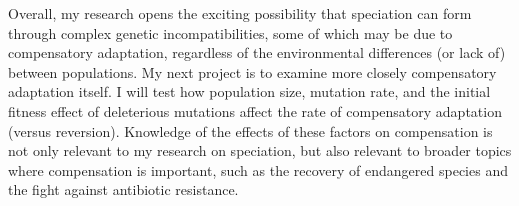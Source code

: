 \documentclass[12pt]{article}
\begin{document}
Overall, my research opens the exciting possibility
that speciation can form through complex genetic incompatibilities,
some of which may be due to compensatory adaptation,
regardless of the environmental differences (or lack of) between populations.
%
My next project is to examine more closely compensatory adaptation itself.
%
I will test how population size, mutation rate,
and the initial fitness effect of deleterious mutations
affect the rate of compensatory adaptation (versus reversion).
%
Knowledge of the effects of these factors on compensation
is not only relevant to my research on speciation,
but also relevant to broader topics where compensation is important,
such as the recovery of endangered species
and the fight against antibiotic resistance.
\end{document}

